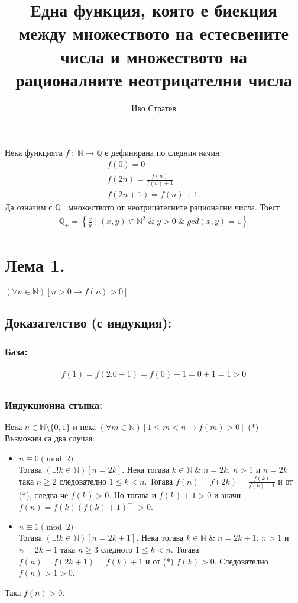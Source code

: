 \documentclass[a4paper, 12pt, oneside]{article}
\title{Една функция, която е биекция между множеството на естесвените числа и множеството на рационалните неотрицателни числа}
\author{Иво Стратев}
\begin{document}
\maketitle
Нека функцията \(f \; : \; \mathbb{N} \to \mathbb{Q}\) е дефинирана по следния начин:
\begin{align*}
f(0) = 0 \\
f(2n) = \displaystyle\frac{f(n)}{f(n) + 1} \\
f(2n + 1) = f(n) + 1.
\end{align*}
Да означим с \(\mathbb{Q}_+\) множеството от неотрицателните рационални числа. Тоест
\begin{align*}
    \mathbb{Q}_+ = \left\{\displaystyle\frac{x}{y} \; \Big| \; (x, y) \in \mathbb{N}^2 \; \& \; y > 0 \; \& \; gcd(x, y) = 1\right\}
\end{align*}
\section*{Лема 1.}
\((\forall n \in \mathbb{N})[n > 0 \longrightarrow f(n) > 0]\)
\subsection*{Доказателство (с индукция):}
\subsubsection*{База:}
\begin{align*}
    f(1) = f(2.0 + 1) = f(0) + 1 = 0 + 1 = 1 > 0 \\
\end{align*}
\subsubsection*{Индукционна стъпка:}
Нека \(n \in \mathbb{N}\setminus\{0, 1\}\) и нека \((\forall m \in \mathbb{N})[1 \leq m < n \longrightarrow f(m) > 0]\) (*) \\
Възможни са два случая:
\begin{itemize}
\item \(n \equiv 0 \pmod{2}\) \\
Тогава \((\exists! k \in \mathbb{N})[n = 2k]\). Нека тогава \(k \in \mathbb{N} \; \& \; n = 2k\).
\(n > 1\) и \(n = 2k\) така \(n \geq 2\) следователно \(1 \leq k < n\). 
Тогава \(f(n) = f(2k) = \displaystyle\frac{f(k)}{f(k) + 1}\) и от (*),
следва че \(f(k) > 0\). Но тогава и \(f(k) + 1 > 0\) и значи \\
\(f(n) = f(k)(f(k) + 1)^{-1} >0\).    
\item \(n \equiv 1 \pmod{2}\) \\
Тогава \((\exists! k \in \mathbb{N})[n = 2k + 1]\). Нека тогава \(k \in \mathbb{N} \; \& \; n = 2k + 1\).
\(n > 1\) и \(n = 2k + 1\) така \(n \geq 3\) следното \(1 \leq k < n\).
Тогава \(f(n) = f(2k + 1) = f(k) + 1\) и от (*) \(f(k) > 0\).
Следователно \(f(n) > 1 > 0\).
\end{itemize}
Така \(f(n) > 0\).
\end{document}
